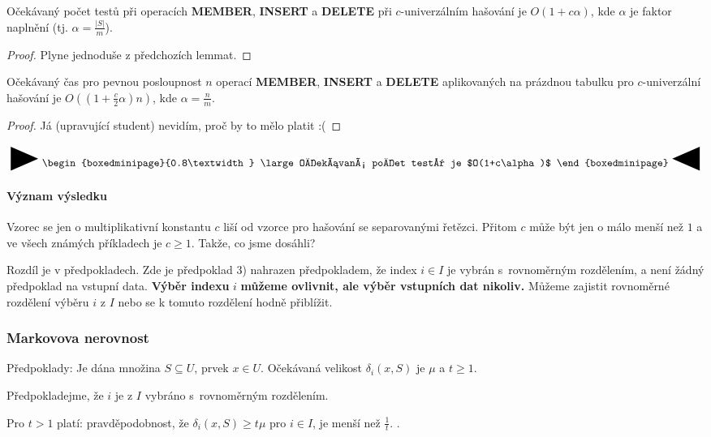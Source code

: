 \documentclass[a4paper,12pt]{article}
\newcommand{\zapamatovat}[1]{
 {
 
 \setlength\fboxrule{5pt}
 \begin{center}
 $\vcenter{
 \hbox{\raisebox{-0.8ex}{\scalebox{1.7}{\Huge\RIGHTarrow}}\begin{boxedminipage}{0.8\textwidth}
\large #1
 \end{boxedminipage}\raisebox{-0.8ex}{\scalebox{1.7}{\Huge\LEFTarrow}}}}$
 \end{center}
 }
 }
\begin{document}
\begin{veta}Očekávaný počet testů při operacích {\bf MEMBER}, {\bf INSERT }
a {\bf DE\-LETE} při $c$-univerzálním hašování je $
O(1+c\alpha )$, kde 
$\alpha$ je faktor napl\-nění (tj. $\alpha =\frac {|S|}m$).
\end{veta}
\begin{proof}
    Plyne jednoduše z předchozích lemmat.
\end{proof}
\begin{veta}
Očekávaný čas pro pevnou posloupnost $n$ operací 
{\bf MEMBER}, {\bf INSERT} a {\bf DELETE} aplikovaných na prázdnou ta\-bulku 
pro $c$-univerzální hašování je $O((1+\frac c2\alpha 
)n)$, kde $\alpha =\frac nm$.  
\end{veta}
\begin{proof}
    Já (upravující student) nevidím, proč by to mělo platit :(
\end{proof}

\zapamatovat{
Očekávaný počet testů je $O(1+c\alpha )$
}

\paragraph{Význam výsledku}  Vzorec se jen o multiplikativní 
konstantu $c$ liší od vzorce pro hašování se separovanými 
řetězci.  Přitom $c$ může být jen o málo menší než $
1$ a 
ve všech známých příkla\-dech je $c\ge 1$.  Takže, co jsme 
dosáhli?  

Rozdíl je v předpokla\-dech.  Zde je předpoklad 3) 
nahrazen předpokladem, že index $i\in I$ je vybrán s~rovnoměrným rozdělením, a není žádný předpoklad na vstupní 
data.  {\bf Výběr indexu} $i$ {\bf můžeme ov\-liv\-nit, ale výběr 
vstupních dat nikoliv.}  Můžeme zajistit rovno\-měr\-né 
rozdělení výběru $i$ z $I$ nebo se k tomuto rozdělení hodně 
přiblížit.  

\subsubsection{Markovova nerovnost}

Předpoklady: Je dána množina $S\subseteq U$, prvek $
x\in U$. 
Očeká\-va\-ná velikost $\delta_i(x,S)$ je $\mu$ a $t\ge 
1$.

Předpokladejme, že $
i$ je z $I$ vybráno s~rovnoměrným rozdělením.
\begin{veta}
Pro $t>1$ platí: pravděpodobnost, že $
\delta_i(x,S)\ge t\mu$ 
pro $i\in I$, je menší než $\frac 1t$. .  
\end{veta}
\end{document}

